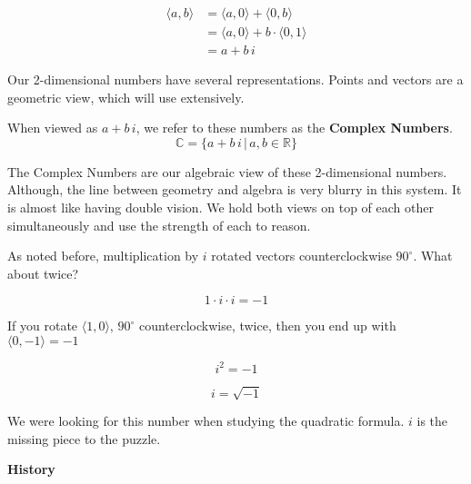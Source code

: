 \documentclass{ximera}
\begin{document}
\begin{align*}
\langle a, b \rangle & = \langle a, 0 \rangle + \langle 0, b \rangle  \\
         & = \langle a, 0 \rangle + b \cdot \langle 0, 1 \rangle  \\
          & = a + b \, i
\end{align*}




Our 2-dimensional numbers have several representations.  Points and vectors are a geometric view, which will use extensively.


When viewed as $a + b \, i$, we refer to these numbers as the \textbf{Complex Numbers}. \\






\[   \mathbb{C}  = \{  a + b \, i   \, | \, a, b \in \mathbb{R}             \}               \]




The Complex Numbers are our algebraic view of these 2-dimensional numbers.  Although, the line between geometry and algebra is very blurry in this system. It is almost like having double vision.  We hold both views on top of each other simultaneously and use the strength of each to reason.





As noted before, multiplication by $i$ rotated vectors counterclockwise $90^{\circ}$. What about twice?


\[  1 \cdot i \cdot i = -1    \]



If you rotate $\langle 1, 0 \rangle$, $90^{\circ}$ counterclockwise, twice, then  you end up with $\langle 0,-1 \rangle = -1$





\[   i^2 = -1\]



\[   i = \sqrt{-1}   \]




We were looking for this number when studying the quadratic formula.  $i$ is the missing piece to the puzzle.











\textbf{\textcolor{purple!50!blue!90!black}{History}}
\end{document}
